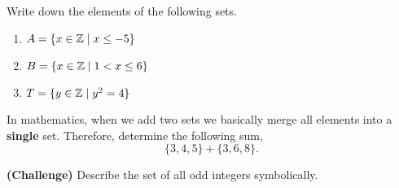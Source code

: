 \documentclass[12pt]{article} %
\begin{document}
\begin{qstn}
	Write down the elements of the following sets.
	\begin{enumerate}[label=(\alph*)]
		\item $A = \{x \in \mathbb Z \mid x \le -5\} $
		\item $B = \{x \in \mathbb Z \mid 1 < x \leq 6 \} $
		\item $T = \{y \in \mathbb Z \mid y^{2} = 4 \} $
	\end{enumerate}
	
\end{qstn}
\begin{qstn}
	In mathematics, when we add two sets we basically merge all elements into a \textbf{single} set. Therefore, determine the
	following sum,\[
	\{3,4,5\}  + \{3,6,8\} 
	.\] 
\end{qstn}

\begin{qstn}
	\textbf{(Challenge)} Describe the set of all odd integers symbolically.
\end{qstn}
\end{document}
